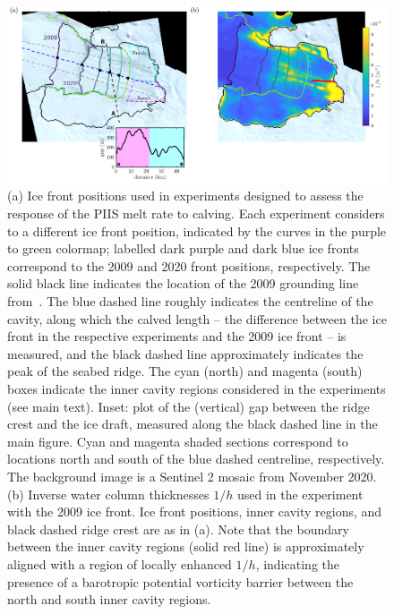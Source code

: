 \documentclass[draft]{agujournal2019}
\begin{document}
\begin{figure}
    \centering
    \includegraphics[width =\textwidth]{../make_figures/plots/figure10.pdf}
    \caption{(a) Ice front positions used in experiments designed to assess the response of the PIIS melt rate to calving. Each experiment considers to a different ice front position, indicated by the curves in the purple to green colormap; labelled dark purple and dark blue ice fronts correspond to the 2009 and 2020 front positions, respectively. The solid black line indicates the location of the 2009 grounding line from~. The blue dashed line roughly indicates the centreline of the cavity, along which the calved length -- the difference between the ice front in the respective experiments and the 2009 ice front -- is measured, and the black dashed line approximately indicates the peak of the seabed ridge. The cyan (north) and magenta (south) boxes indicate the inner cavity regions considered in the experiments (see main text). Inset: plot of the (vertical) gap between the ridge crest and the ice draft, measured along the black dashed line in the main figure. Cyan and magenta shaded sections correspond to locations north and south of the blue dashed centreline, respectively. The background image is a Sentinel 2 mosaic from November 2020. (b) Inverse water column thicknesses $1/h$ used in the experiment with the 2009 ice front. Ice front positions, inner cavity regions, and black dashed ridge crest are as in (a).  Note that the boundary between the inner cavity regions (solid red line) is approximately aligned with a region of locally enhanced $1/h$, indicating the presence of a barotropic potential vorticity barrier between the north and south inner cavity regions.}
    \label{fig:figure10}
\end{figure}

\end{document}
